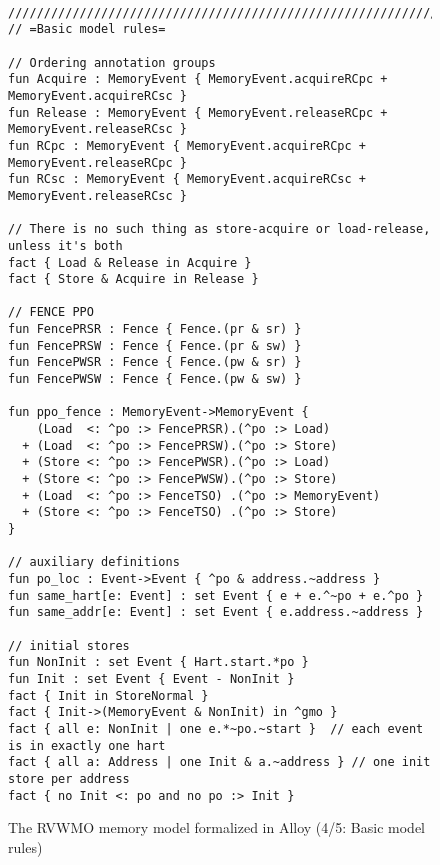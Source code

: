 \begin{figure}[h!]
  {
  \tt\bfseries\centering\footnotesize
  \begin{lstlisting}
////////////////////////////////////////////////////////////////////////////////
// =Basic model rules=

// Ordering annotation groups
fun Acquire : MemoryEvent { MemoryEvent.acquireRCpc + MemoryEvent.acquireRCsc }
fun Release : MemoryEvent { MemoryEvent.releaseRCpc + MemoryEvent.releaseRCsc }
fun RCpc : MemoryEvent { MemoryEvent.acquireRCpc + MemoryEvent.releaseRCpc }
fun RCsc : MemoryEvent { MemoryEvent.acquireRCsc + MemoryEvent.releaseRCsc }

// There is no such thing as store-acquire or load-release, unless it's both
fact { Load & Release in Acquire }
fact { Store & Acquire in Release }

// FENCE PPO
fun FencePRSR : Fence { Fence.(pr & sr) }
fun FencePRSW : Fence { Fence.(pr & sw) }
fun FencePWSR : Fence { Fence.(pw & sr) }
fun FencePWSW : Fence { Fence.(pw & sw) }

fun ppo_fence : MemoryEvent->MemoryEvent {
    (Load  <: ^po :> FencePRSR).(^po :> Load)
  + (Load  <: ^po :> FencePRSW).(^po :> Store)
  + (Store <: ^po :> FencePWSR).(^po :> Load)
  + (Store <: ^po :> FencePWSW).(^po :> Store)
  + (Load  <: ^po :> FenceTSO) .(^po :> MemoryEvent)
  + (Store <: ^po :> FenceTSO) .(^po :> Store)
}

// auxiliary definitions
fun po_loc : Event->Event { ^po & address.~address }
fun same_hart[e: Event] : set Event { e + e.^~po + e.^po }
fun same_addr[e: Event] : set Event { e.address.~address }

// initial stores
fun NonInit : set Event { Hart.start.*po }
fun Init : set Event { Event - NonInit }
fact { Init in StoreNormal }
fact { Init->(MemoryEvent & NonInit) in ^gmo }
fact { all e: NonInit | one e.*~po.~start }  // each event is in exactly one hart
fact { all a: Address | one Init & a.~address } // one init store per address
fact { no Init <: po and no po :> Init }
\end{lstlisting}}
  \caption{The RVWMO memory model formalized in Alloy (4/5: Basic model rules)}
  \label{fig:alloy4}
\end{figure}

